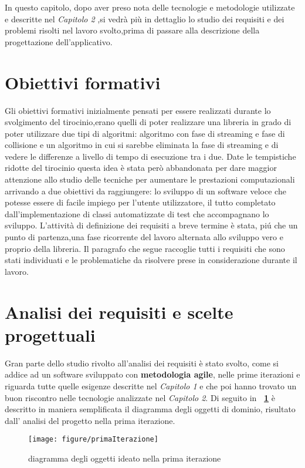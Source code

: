 In questo capitolo, dopo aver preso nota delle tecnologie e metodologie utilizzate e descritte nel \textit{Capitolo 2} ,si vedr\`a pi\`u in dettaglio lo studio dei requisiti e dei problemi risolti nel lavoro svolto,prima di passare alla descrizione della progettazione dell'applicativo.

\section{Obiettivi formativi}
Gli obiettivi formativi inizialmente pensati per essere realizzati durante lo svolgimento del tirocinio,erano quelli di poter realizzare una libreria in grado di poter utilizzare due tipi di algoritmi: algoritmo con fase di streaming e fase di collisione e un algoritmo in cui si sarebbe eliminata la fase di streaming e di vedere le differenze a livello di tempo di esecuzione tra i due. Date le tempistiche ridotte del tirocinio questa idea \`e stata per\`o abbandonata per dare maggior attenzione allo studio delle tecniche per aumentare le prestazioni computazionali arrivando a due obiettivi da raggiungere: lo sviluppo di un software veloce che potesse essere di facile impiego per l'utente utilizzatore, il tutto completato dall'implementazione di classi automatizzate di test che accompagnano lo sviluppo. L’attivit\`a di definizione dei requisiti a breve termine \`e stata, pi\'u che un punto di partenza,una fase ricorrente del lavoro alternata allo sviluppo vero e proprio della libreria. Il paragrafo che segue raccoglie tutti i requisiti che sono stati individuati e le problematiche da risolvere prese in considerazione durante il lavoro.

\section{Analisi dei requisiti e scelte progettuali}

Gran parte dello studio rivolto all'analisi dei requisiti \`e stato svolto, come si addice ad un software sviluppato con \textbf{metodologia agile}, nelle prime iterazioni e riguarda tutte quelle esigenze descritte nel \textit{Capitolo 1} e che poi hanno trovato un buon riscontro nelle tecnologie analizzate nel \textit{Capitolo 2}. Di seguito in \textbf{\figurename~\ref{fig:primaiterazione}}
\`e descritto in maniera semplificata il diagramma degli oggetti di dominio, risultato dall' analisi del progetto nella prima iterazione.
\begin{figure}[!htb]
	\begin{center}
		\texttt{[image: figure/primaIterazione]}
	\end{center}
	\caption{diagramma degli oggetti ideato nella prima iterazione \label{fig:primaiterazione}}
\end{figure}\hfill

